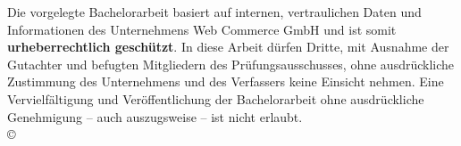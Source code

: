 
\noindent Die vorgelegte Bachelorarbeit basiert auf internen, vertraulichen Daten und Informationen des Unternehmens Web Commerce GmbH und ist somit \textbf{urheberrechtlich geschützt}. In diese Arbeit dürfen Dritte, mit Ausnahme der Gutachter und befugten Mitgliedern des Prüfungsausschusses, ohne ausdrückliche Zustimmung des Unternehmens und des Verfassers keine Einsicht nehmen. Eine Vervielfältigung und Veröffentlichung der Bachelorarbeit ohne ausdrückliche Genehmigung – auch auszugsweise – ist nicht erlaubt. \\[3ex]
\copyright\ \Jahr \ \Autor